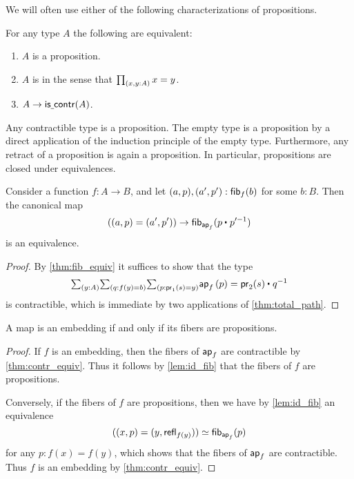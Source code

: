 We will often use either of the following characterizations of propositions.

\begin{lem}\label{lem:prop_char}
For any type $A$ the following are equivalent:
\begin{enumerate}
\item $A$ is a proposition.
\item $A$ is  in the sense that $\prd{x,y:A}x=y$.
\item $A\to\mathsf{is\underline{\ }{}contr}(A)$. 
\end{enumerate}
\end{lem}

\begin{eg}\label{eg:prop_contr}
Any contractible type is a proposition. The empty type is a proposition by a direct application of the induction principle of the empty type. Furthermore, any retract of a proposition is again a proposition. In particular, propositions are closed under equivalences.
\end{eg}

\begin{lem}\label{lem:id_fib}
Consider a function $f:A\to B$, and let $(a,p),(a',p'):\mathsf{fib}_{f}(b)$ for some $b:B$. Then the canonical map
\begin{equation*}
((a,p)=(a',p'))\to \fib{\apfunc{f}}{\ct{p}{p'^{-1}}}
\end{equation*}
is an equivalence.
\end{lem}

\begin{proof}
By \cref{thm:fib_equiv} it suffices to show that the type
\begin{equation*}
\sm{y:A}{q:f(y)=b}{p:\proj 1(s)=y} \ap{f}{p}=\ct{\proj 2(s)}{q^{-1}}
\end{equation*}
is contractible, which is immediate by two applications of \cref{thm:total_path}.
\end{proof}

\begin{prp}\label{thm:prop_emb}
A map is an embedding if and only if its fibers are propositions.
\end{prp}

\begin{proof}
If $f$ is an embedding, then the fibers of $\mathsf{ap}_{f}$ are contractible by \cref{thm:contr_equiv}. Thus it follows by \cref{lem:id_fib} that the fibers of $f$ are propositions.

Conversely, if the fibers of $f$ are propositions, then we have by \cref{lem:id_fib} an equivalence
\begin{equation*}
\eqv{((x,p)=(y,\refl{f(y)}))}{\fib{\apfunc{f}}{p}}
\end{equation*}
for any $p:f(x)=f(y)$, which shows that the fibers of $\mathsf{ap}_{f}$ are contractible. Thus $f$ is an embedding by \cref{thm:contr_equiv}.
\end{proof}

